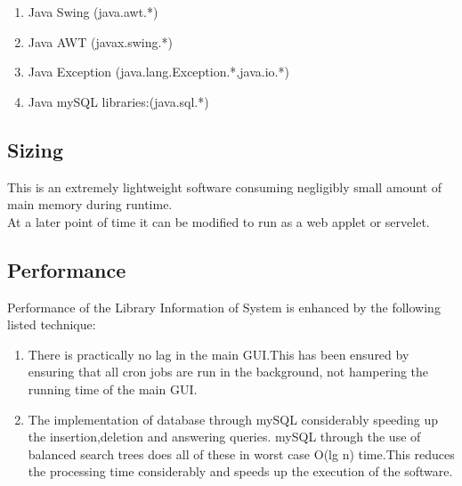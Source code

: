 \documentclass[a4paper]{article}
\begin{document}
\begin{enumerate}
\item Java Swing (java.awt.*)
\item Java AWT   (javax.swing.*)
\item Java Exception  (java.lang.Exception.*,java.io.*)
\item Java mySQL libraries:(java.sql.*)
\end{enumerate}
\subsection{Sizing}
This is an extremely lightweight software consuming negligibly small amount of main memory during runtime.\\ 
At a later point of time it can be modified to run as a web applet or servelet. 

\subsection{Performance}
Performance of the Library Information of System is enhanced by the following listed technique:
\begin{enumerate}
\item There is practically no lag in the main GUI.This has been ensured by 
ensuring that all cron jobs are run in the background, not hampering the running time of the main GUI.
\item The implementation of database through mySQL considerably speeding up the insertion,deletion and answering queries. mySQL through the use of balanced search trees does all of these in worst case O(lg n) time.This reduces the processing time considerably and speeds up the execution of the software. 

\end{enumerate}
\end{document}
